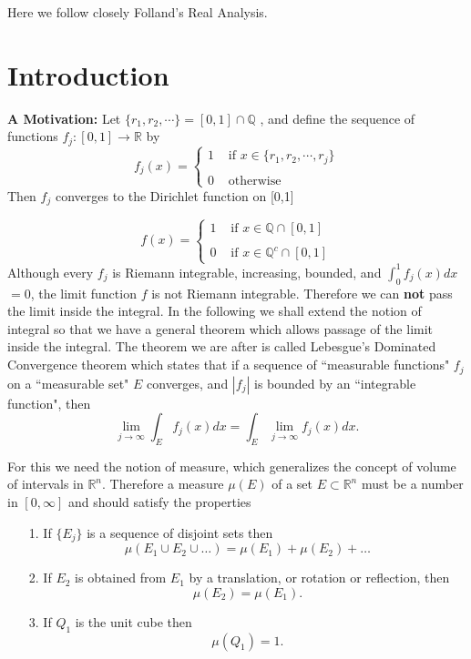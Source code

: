 \documentclass[12pt]{report}
\begin{document}
Here we follow closely  Folland's Real Analysis.


\section{Introduction} {\large\bf A Motivation:} Let $\{r_1, r_2,\cdots\}
=[0, 1]\cap\mathbb{Q}$ , and define the sequence of functions
$f_j:[0, 1]\to\mathbb{R}$ by 
\[ f_j(x) = \left \{\begin{array}{ll} 1 &\mbox{ if } x \in 
\{r_1, r_2,\cdots, r_j\}\\
\\ 0 &\mbox{ otherwise } \end{array} \right .
\] Then $f_j$ converges to the Dirichlet function on [0,1]

\[ f(x) = \left \{\begin{array}{ll} 1 &\mbox{ if } x  \in
\mathbb{Q} \cap [0,1]\\
\\
 0 &\mbox{ if } x \in \mathbb{Q}^c \cap [0,1] \end{array}
\right .
\] Although every $f_j$ is Riemann integrable, increasing,  bounded, and
$\int_0^1f_j(x) dx$$=0$,
 the limit function $f$ is not Riemann integrable.  Therefore we can {\bf
not} pass the limit inside the integral. In the following  we shall extend the
notion of integral so that we  have a  general theorem which allows
passage of the limit inside the integral. The theorem we are after is called
Lebesgue's Dominated Convergence  theorem  which states that if a
sequence of ``measurable functions" $f_j$
 on a ``measurable set"  $E$ converges, and 
$|f_j|$ is bounded by an ``integrable function", then
\[
\lim_{j\to\infty}\int_E f_j(x)dx=
\int_E \lim_{j\to\infty} f_j(x)dx.
\]


\vspace{.15cm}
\noindent  For this we need the notion of measure, which generalizes the
concept of volume of intervals  in
$\mathbb{R}^n$.  Therefore a measure $\mu(E) $ of a set $E \subset
\mathbb{R}^n$ must be a number in $[0, \infty]$ and should satisfy the
properties
\begin{itemize}
\item[1.]  If $\{E_j\}$ is a sequence of disjoint sets then
\[
\mu(E_1 \cup E_2 \cup \dots ) = \mu(E_1) + \mu(E_2)+ \dots 
\]
\item[2.]  If $E_2$ is obtained from $E_1$ by a translation,  or rotation or
reflection, then 
\[
\mu(E_2) = \mu(E_1).
\]
\item[3.]  If $Q_1$ is the unit cube then
\[
\mu(Q_1) = 1.
\]
\end{itemize}
\end{document}
